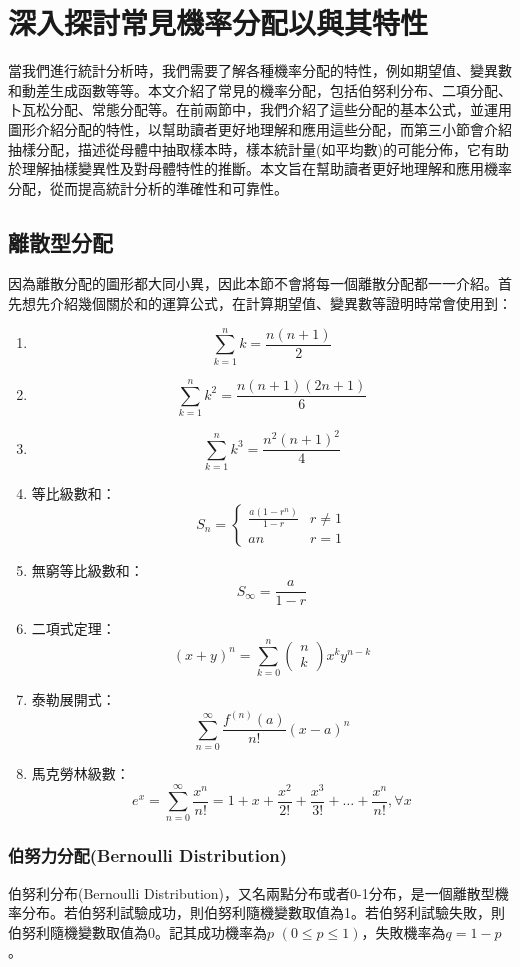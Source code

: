 \chapter{深入探討常見機率分配以與其特性}
當我們進行統計分析時，我們需要了解各種機率分配的特性，例如期望值、變異數和動差生成函數等等。本文介紹了常見的機率分配，包括伯努利分布、二項分配、卜瓦松分配、常態分配等。在前兩節中，我們介紹了這些分配的基本公式，並運用圖形介紹分配的特性，以幫助讀者更好地理解和應用這些分配，而第三小節會介紹抽樣分配，描述從母體中抽取樣本時，樣本統計量(如平均數)的可能分佈，它有助於理解抽樣變異性及對母體特性的推斷。本文旨在幫助讀者更好地理解和應用機率分配，從而提高統計分析的準確性和可靠性。
\section{離散型分配}
因為離散分配的圖形都大同小異，因此本節不會將每一個離散分配都一一介紹。首先想先介紹幾個關於和的運算公式，在計算期望值、變異數等證明時常會使用到：
\begin{enumerate}
\item $$\sum_{k=1}^nk=\frac{n(n+1)}{2}$$
\item $$\sum_{k=1}^nk^2=\frac{n(n+1)(2n+1)}{6}$$
\item $$\sum_{k=1}^nk^3=\frac{n^2(n+1)^2}{4}$$
\item 等比級數和：$${\displaystyle S_{n}={\begin{cases}{\frac {a(1-r^{n})}{1-r}}&r\neq 1\\an&r=1\end{cases}}}$$
\item 無窮等比級數和：$${\displaystyle S_{\infty }={\frac {a}{1-r}}}$$
\item 二項式定理：$$(x+y)^n=\sum_{k=0}^n\left(\begin{array}{c}n\\ k\end{array}\right)x^ky^{n-k}$$
\item 泰勒展開式：$$\sum_{n=0}^\infty\frac{f^{(n)}(a)}{n!}(x-a)^n$$
\item 馬克勞林級數：$$e^x=\sum_{n=0}^\infty\frac{x^n}{n!}=1+x+\frac{x^2}{2!}+\frac{x^3}{3!}+\dots+\frac{x^n}{n!},\forall x$$
\end{enumerate}
\subsection{伯努力分配(Bernoulli Distribution)}
伯努利分布(Bernoulli Distribution)，又名兩點分布或者0-1分布，是一個離散型機率分布。若伯努利試驗成功，則伯努利隨機變數取值為1。若伯努利試驗失敗，則伯努利隨機變數取值為0。記其成功機率為$p$ $(0\leq p\leq 1)$，失敗機率為$q=1-p$。

